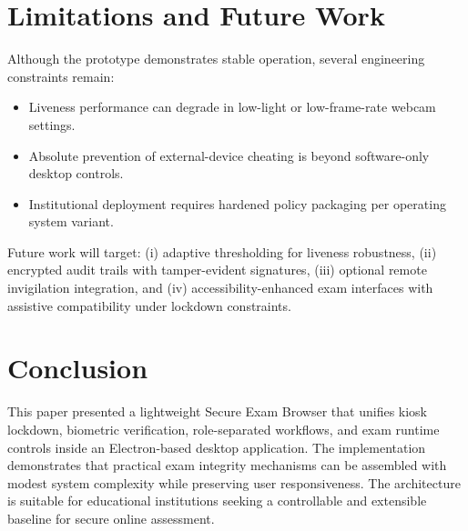 \documentclass[conference]{IEEEtran}
\begin{document}
\section{Limitations and Future Work}
Although the prototype demonstrates stable operation, several engineering constraints remain:
\begin{itemize}
\item Liveness performance can degrade in low-light or low-frame-rate webcam settings.
\item Absolute prevention of external-device cheating is beyond software-only desktop controls.
\item Institutional deployment requires hardened policy packaging per operating system variant.
\end{itemize}

Future work will target: (i) adaptive thresholding for liveness robustness, (ii) encrypted audit trails with tamper-evident signatures, (iii) optional remote invigilation integration, and (iv) accessibility-enhanced exam interfaces with assistive compatibility under lockdown constraints.

\section{Conclusion}
This paper presented a lightweight Secure Exam Browser that unifies kiosk lockdown, biometric verification, role-separated workflows, and exam runtime controls inside an Electron-based desktop application. The implementation demonstrates that practical exam integrity mechanisms can be assembled with modest system complexity while preserving user responsiveness. The architecture is suitable for educational institutions seeking a controllable and extensible baseline for secure online assessment.
\end{document}
